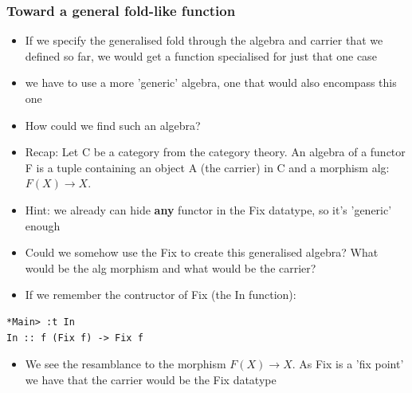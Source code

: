 \documentclass[10pt]{beamer}
\begin{document}
\begin{frame}[fragile]
\frametitle{Toward a general fold-like function}
\begin{itemize}
\item If we specify the generalised fold through the algebra and carrier that we defined so far, we would get a function specialised for just that one case
\item we have to use a more 'generic' algebra, one that would also encompass this one	
\item How could we find such an algebra?
\item Recap: Let C be a category from the category theory. An algebra of a functor F is a tuple containing an object A (the carrier) in C and a morphism alg:$F(X) \rightarrow X$. 
\item Hint: we already can hide \textbf{any} functor in the Fix datatype, so it's 'generic' enough
\item Could we somehow use the Fix to create this generalised algebra? What would be the alg morphism and what would be the carrier?
\item If we remember the contructor of Fix (the In function):	
\end{itemize}


\begin{lstlisting}
*Main> :t In
In :: f (Fix f) -> Fix f
\end{lstlisting}


\begin{itemize}
\item We see the resamblance to the morphism $F(X) \rightarrow X$. As Fix is a 'fix point' we have that the carrier would be the Fix datatype
\end{itemize}

\end{frame}
\end{document}
